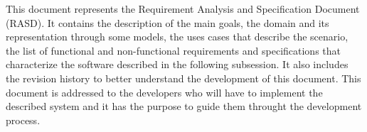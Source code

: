 This document represents the Requirement Analysis and Specification Document (RASD).
It contains the description of the main goals, the domain and its representation through some models, the uses cases that describe the scenario, the list of functional and non-functional requirements and specifications that characterize the software described in the following subsession.
It also includes the revision history to better understand the development of this document.
This document is addressed to the developers who will have to implement the described system and it has the purpose to guide them throught the development process.